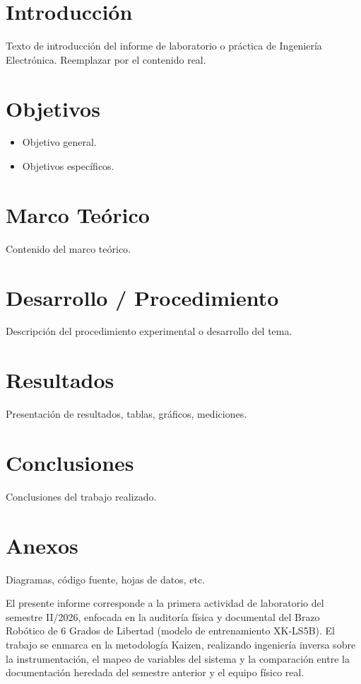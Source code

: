 \documentclass[11pt]{article}
\begin{document}
\newpage

\tableofcontents
\newpage

\section{Introducci\'on}
	Texto de introducci\'on del informe de laboratorio o pr\'actica de
	Ingenier\'ia Electr\'onica. Reemplazar por el contenido real.
	
	\section{Objetivos}
	\begin{itemize}
		\item Objetivo general.
		\item Objetivos espec\'ificos.
	\end{itemize}
	
	\section{Marco Te\'orico}
	Contenido del marco te\'orico.
	
	\section{Desarrollo / Procedimiento}
	Descripci\'on del procedimiento experimental o desarrollo del tema.
	
	\section{Resultados}
	Presentaci\'on de resultados, tablas, gr\'aficos, mediciones.
	
	\section{Conclusiones}
	Conclusiones del trabajo realizado.
	
	\newpage
	\section{Anexos}
	Diagramas, c\'odigo fuente, hojas de datos, etc.
	
	
	
	El presente informe corresponde a la primera actividad de laboratorio del semestre II/2026, enfocada en la auditoría física y documental del Brazo Robótico de 6 Grados de Libertad (modelo de entrenamiento XK-LS5B). El trabajo se enmarca en la metodología Kaizen, realizando ingeniería inversa sobre la instrumentación, el mapeo de variables del sistema y la comparación entre la documentación heredada del semestre anterior y el equipo físico real.
\end{document}

